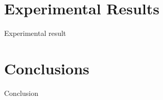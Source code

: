 \documentclass{svproc}
\begin{document}

\section{Experimental Results}
Experimental result

\section{Conclusions}
Conclusion
%
%

%
%
%
%
%
%
\end{document}
